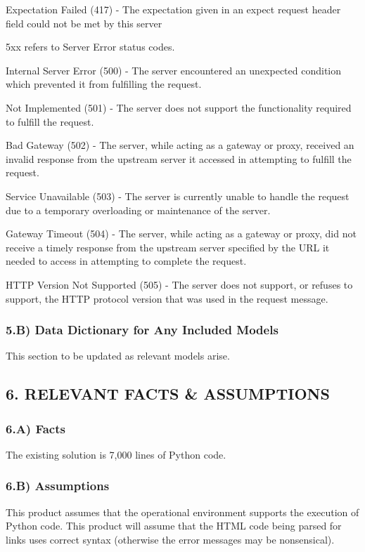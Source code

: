 \documentclass[12pt]{article}
\begin{document}
Expectation Failed (417) - The expectation given in an expect request header field could not be met by this server

5xx refers to Server Error status codes.

Internal Server Error (500) - The server encountered an unexpected condition which prevented it from fulfilling the request.

Not Implemented (501) - The server does not support the functionality required to fulfill the request.

Bad Gateway (502) - The server, while acting as a gateway or proxy, received an invalid response from the upstream server it accessed in attempting to fulfill the request.

Service Unavailable (503) - The server is currently unable to handle the request due to a temporary overloading or maintenance of the server.

Gateway Timeout (504) - The server, while acting as a gateway or proxy, did not receive a timely response from the upstream server specified by the URL it needed to access in attempting to complete the request.

HTTP Version Not Supported (505) - The server does not support, or refuses to support, the HTTP protocol version that was used in the request message.

\subsubsection{5.B) Data Dictionary for Any Included Models}
This section to be updated as relevant models arise.

\subsection{6. RELEVANT FACTS \& ASSUMPTIONS}

\subsubsection{6.A) Facts}
The existing solution is 7,000 lines of Python code.

\subsubsection{6.B) Assumptions}
This product assumes that the operational environment supports the execution of Python code.
This product will assume that the HTML code being parsed for links uses correct syntax (otherwise the error messages may be nonsensical).
\end{document}
